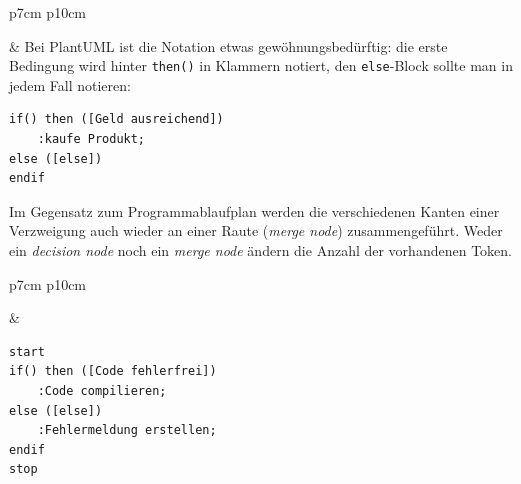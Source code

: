 \documentclass[10pt]{scrartcl}
\begin{document}
\begin{tabular}[b]{p{7cm} p{10cm}}
	
	&
	Bei PlantUML ist die Notation etwas gewöhnungsbedürftig: die erste Bedingung wird hinter \texttt{then()} in Klammern notiert, den \texttt{else}-Block sollte man in jedem Fall notieren:
	\begin{lstlisting}[style=plantuml]
if() then ([Geld ausreichend])
	:kaufe Produkt;
else ([else])
endif
	\end{lstlisting}
	Im Gegensatz zum Programmablaufplan werden die verschiedenen Kanten einer Verzweigung auch wieder an einer Raute (\textit{merge node}) zusammengeführt. Weder ein \textit{decision node} noch ein \textit{merge node} ändern die Anzahl der vorhandenen Token.
\end{tabular}


\begin{tabular}[b]{p{7cm} p{10cm}}
	
	&
	
	\begin{lstlisting}[style=plantuml]
start
if() then ([Code fehlerfrei])
	:Code compilieren;
else ([else])
	:Fehlermeldung erstellen;
endif
stop
	\end{lstlisting}
\end{tabular}
\end{document}
